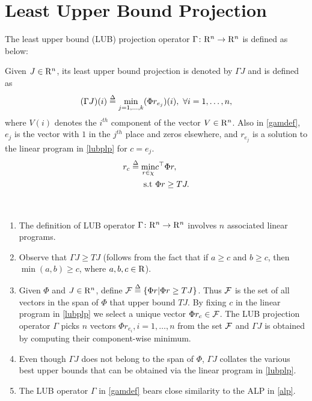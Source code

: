 \section{Least Upper Bound Projection}\label{sec:lubp}
The least upper bound (LUB) projection operator $\Gamma \colon \mathrm{R}^n \rightarrow\mathrm{R}^n$ is defined as below:
\begin{definition}\label{lubpop}
Given $J\in \mathrm{R}^n$, its least upper bound projection is denoted by $\Gamma J$ and is defined as 
\begin{align}\label{gamdef}
(\Gamma J)(i)\stackrel{\Delta}{=}\underset{j=1,\ldots,k}{\min} (\Phi r_{e_j})(i), \mbox{ } \forall i=1,\ldots,n,
\end{align}
where $V(i)$ denotes the $i^{th}$ component of the vector $V\in \mathrm{R}^n$. Also in \eqref{gamdef}, $e_j$ is the vector with $1$ in the $j^{th}$ place and zeros elsewhere, and $r_{e_j}$ is a solution to the linear program in \eqref{lubplp} for $c=e_j$.
\begin{align}\label{lubplp}
r_c\stackrel{\Delta}{=}\min_{r\in \chi} &c^\top \Phi r,\nonumber\\
\text{s.t}\mbox{ } &\Phi r\geq  TJ.
\end{align}
\end{definition}
\vspace{-10pt}
\begin{remark}
\mb\\
\vspace{-10pt}
\begin{enumerate}
\item The definition of LUB operator $\Gamma \colon \mathrm{R}^n \rightarrow \mathrm{R}^n$ involves $n$ associated linear programs.
\item Observe that $\Gamma J\geq TJ$ (follows from the fact that if $a\geq c$ and $b\geq c$, then $\min(a,b)\geq c$, where $a, b, c \in \mathrm{R}$).
\item Given $\Phi$ and $J\in \mathrm{R}^n$, define $\mathcal{F}\stackrel{\Delta}{=}\{\Phi r|\Phi r\geq TJ\}$. Thus $\mathcal{F}$ is the set of all vectors in the span of $\Phi$ that upper bound $TJ$. By fixing $c$ in the linear program in \eqref{lubplp} we select a unique vector $\Phi r_c \in \mathcal{F}$. The LUB projection operator $\Gamma$ picks $n$ vectors $\Phi r_{e_i},i=1,\ldots,n$ from the set $\mathcal{F}$ and $\Gamma J$ is obtained by computing their component-wise minimum.
\item Even though $\Gamma J$ does not belong to the span of $\Phi$, $\Gamma J$ collates the various best upper bounds that can be obtained via the linear program in \eqref{lubplp}.
\item The LUB operator $\Gamma$ in \eqref{gamdef} bears close similarity to the ALP in \eqref{alp}.
\end{enumerate}
\end{remark}
